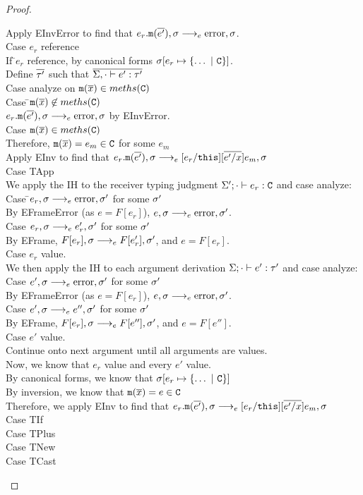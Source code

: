 \documentclass{report}
\begin{document}
\begin{proof}
\begin{tabbing}
\> \> \> Apply EInvError to find that $e_r.\texttt{m}(\overline{ e'} ),\sigma \longrightarrow_{e} \text{error},\sigma$.\\
\> \> Case $e_r$ reference \\
\> \> \> If \=$e_r$ reference, by canonical forms $\sigma[e_r \mapsto \{\ldots ~|~ \texttt{C} \}]$.\\
\> \> \> Define $\overline{ \tau'} $ such that $\overline{ \Sigma,\cdot \vdash e' : \tau'} $\\
\> \> \> Case analyze on $\texttt{m}(\overline{ x} ) \in meths(\texttt{C})$\\
\> \> \> \> Case \=$\texttt{m}(\overline{ x} ) \not\in meths(\texttt{C})$ \\
\> \> \> \> \> $e_r.\texttt{m}(\overline{ e'} ),\sigma \longrightarrow_{e} \text{error},\sigma$ by EInvError.\\
\> \> \> \> Case $\texttt{m}(\overline{ x} ) \in meths(\texttt{C})$ \\
\> \> \> \> \> Therefore, $\texttt{m}(\overline{ x} ) = e_m \in \texttt{C}$ for some $e_m$\\
\> \> \> \> \> Apply EInv to find that $e_r.\texttt{m}(\overline{ e'} ),\sigma \longrightarrow_{e} [e_r/\texttt{this}][\overline{ e'/x} ]e_m,\sigma$ \\
Case TApp\\
\> We apply the IH to the receiver typing judgment $\Sigma';\cdot \vdash e_r : \texttt{C}$ and case analyze:\\
\> \> Case \=$e_r,\sigma \longrightarrow_{e} \text{error},\sigma'$ for some $\sigma'$\\
\> \> \> By EFrameError (as $e = F[e_r]$), $e,\sigma \longrightarrow_{e} \text{error},\sigma'$.\\
\> \> Case $e_r,\sigma \longrightarrow_{e} e_r',\sigma'$ for some $\sigma'$\\
\> \> \> By EFrame, $F[e_r],\sigma \longrightarrow_{e} F[e_r'],\sigma'$, and $e = F[e_r]$.\\
\> \> Case $e_r$ value.\\
\> We then apply the IH to each argument derivation $\Sigma;\cdot \vdash e' : \tau'$ and case analyze:\\
\> \> Case $e',\sigma \longrightarrow_{e} \text{error},\sigma'$ for some $\sigma'$\\
\> \> \> By EFrameError (as $e = F[e_r]$), $e,\sigma \longrightarrow_{e} \text{error},\sigma'$.\\
\> \> Case $e',\sigma \longrightarrow_{e} e'',\sigma'$ for some $\sigma'$\\
\> \> \> By EFrame, $F[e_r],\sigma \longrightarrow_{e} F[e''],\sigma'$, and $e = F[e'']$.\\
\> \> Case $e'$ value.\\
\> \> \> Continue onto next argument until all arguments are values. \\
\> Now, we know that $e_r$ value and every $e'$ value.\\
\> By canonical forms, we know that $\sigma[e_r \mapsto \{ \ldots ~|~ \texttt{C}\}]$\\
\> By inversion, we know that $\texttt{m}(\overline{ x} ) = e \in \texttt{C}$\\
\> Therefore, we apply EInv to find that $e_r.\texttt{m}(\overline{ e'} ),\sigma \longrightarrow_{e} [e_r/\texttt{this}][\overline{ e'/x} ]e_m,\sigma$ \\
Case TIf\\
Case TPlus\\
Case TNew\\
Case TCast\\
\end{tabbing}
\end{proof}
\end{document}
